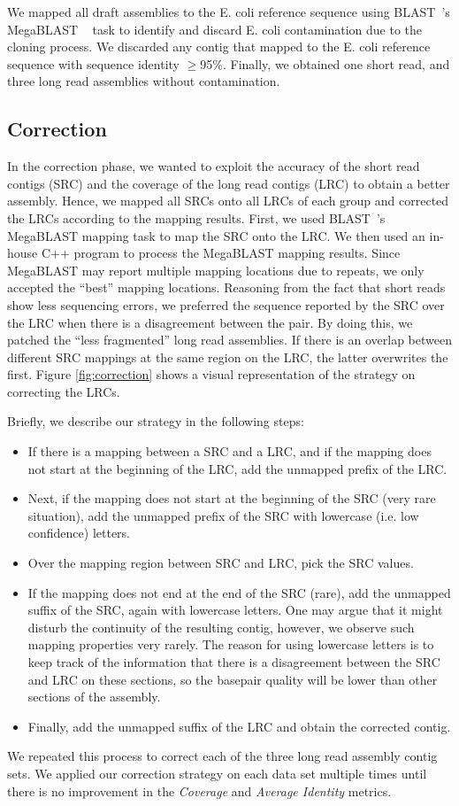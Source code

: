 \documentclass{llncs}
\begin{document}
We mapped all draft assemblies to the E. coli reference sequence using BLAST~\cite{blast}'s MegaBLAST ~\cite{megablast} task to identify and discard E. coli contamination due to the cloning process. We discarded any contig that mapped to the E. coli reference sequence with sequence identity $\geq$95\%. Finally, we obtained one short read, and three long read assemblies without contamination.

\subsection{Correction} 
\label{correc}
In the correction phase, we wanted to exploit the accuracy of the short read contigs (SRC) and the coverage of the long read contigs (LRC) to obtain a better assembly. 
Hence, we mapped all SRCs onto all LRCs of each group and corrected the LRCs according to the mapping results.
First, we used BLAST~\cite{blast}'s MegaBLAST \cite{megablast} mapping task to map the SRC onto the LRC.
We then used an in-house C++ program to process the MegaBLAST mapping results. 
Since MegaBLAST may report multiple mapping locations due to repeats, we only accepted the ``best'' mapping locations. 
Reasoning from the fact that short reads show less sequencing errors, we preferred the sequence reported by the SRC over the LRC when there is a disagreement between the pair. 
By doing this, we patched the ``less fragmented'' long read assemblies. 
If there is an overlap between different SRC mappings at the same region on the LRC, the latter overwrites the first. 
Figure \ref{fig:correction} shows a visual representation of the strategy on correcting the LRCs. 

Briefly, we describe our strategy in the following steps: 
\begin{itemize}
\item If there is a mapping between a SRC and a LRC, and if the mapping does not start at the beginning of the LRC, add the unmapped prefix of the LRC. 
\item Next, if the mapping does not start at the beginning of the SRC (very rare situation), add the unmapped prefix of the SRC with lowercase (i.e. low confidence) letters. 
\item Over the mapping region between SRC and LRC, pick the SRC values. 
\item If the mapping does not end at the end of the SRC (rare), add the unmapped suffix of the SRC, again with lowercase letters. One may argue that it might disturb the continuity of the resulting contig, however, we observe such mapping properties very rarely. The reason for using lowercase letters is to keep track of the information that there is a disagreement between the SRC and LRC on these sections, so the basepair quality will be lower than other sections of the assembly. 
\item Finally, add the unmapped suffix of the LRC and obtain the corrected contig.
\end{itemize}
We repeated this process to correct each of the three long read assembly contig sets. We applied our correction strategy on each data set multiple times until there is no improvement in the
{\it Coverage} and  {\it Average Identity} metrics. 
\end{document}

